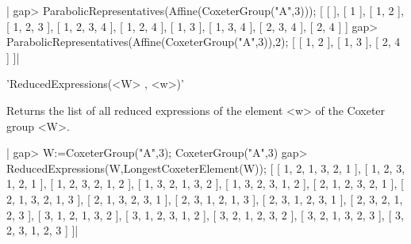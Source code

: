 |    gap> ParabolicRepresentatives(Affine(CoxeterGroup("A",3)));
    [ [  ], [ 1 ], [ 1, 2 ], [ 1, 2, 3 ], [ 1, 2, 3, 4 ], [ 1, 2, 4 ],
      [ 1, 3 ], [ 1, 3, 4 ], [ 2, 3, 4 ], [ 2, 4 ] ]
    gap> ParabolicRepresentatives(Affine(CoxeterGroup("A",3)),2);
    [ [ 1, 2 ], [ 1, 3 ], [ 2, 4 ] ]|


'ReducedExpressions(<W> , <w>)'

Returns  the list  of all  reduced expressions  of the  element <w>  of the
Coxeter group <W>.

|    gap> W:=CoxeterGroup("A",3);
    CoxeterGroup("A",3)
    gap> ReducedExpressions(W,LongestCoxeterElement(W));
    [ [ 1, 2, 1, 3, 2, 1 ], [ 1, 2, 3, 1, 2, 1 ], [ 1, 2, 3, 2, 1, 2 ], 
      [ 1, 3, 2, 1, 3, 2 ], [ 1, 3, 2, 3, 1, 2 ], [ 2, 1, 2, 3, 2, 1 ], 
      [ 2, 1, 3, 2, 1, 3 ], [ 2, 1, 3, 2, 3, 1 ], [ 2, 3, 1, 2, 1, 3 ], 
      [ 2, 3, 1, 2, 3, 1 ], [ 2, 3, 2, 1, 2, 3 ], [ 3, 1, 2, 1, 3, 2 ], 
      [ 3, 1, 2, 3, 1, 2 ], [ 3, 2, 1, 2, 3, 2 ], [ 3, 2, 1, 3, 2, 3 ], 
      [ 3, 2, 3, 1, 2, 3 ] ]|

